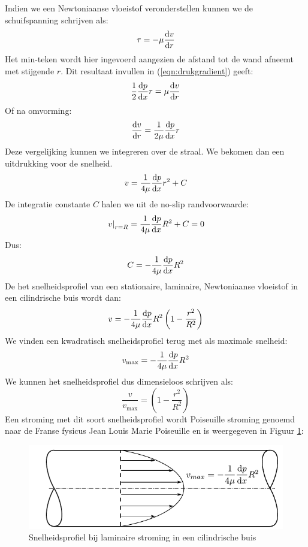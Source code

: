 Indien we een Newtoniaanse vloeistof veronderstellen kunnen we de schuifspanning schrijven als:
\begin{equation}
	\tau = -\mu \frac{\mathrm{d} v}{\mathrm{d} r}
\end{equation}
Het min-teken wordt hier ingevoerd aangezien de afstand tot de wand afneemt met stijgende $r$. Dit resultaat invullen in (\ref{eqn:drukgradient}) geeft:
\begin{equation}
	\frac{1}{2} \frac{\mathrm{d} p}{\mathrm{d} x} r = \mu \frac{\mathrm{d} v}{\mathrm{d} r}
\end{equation}
Of na omvorming:
\begin{equation}
	\frac{\mathrm{d} v}{\mathrm{d} r} = \frac{1}{2 \mu}\frac{\mathrm{d} p}{\mathrm{d} x} r
\end{equation}
Deze vergelijking kunnen we integreren over de straal. We bekomen dan een uitdrukking voor de snelheid.
\begin{equation}
	v = \frac{1}{4 \mu}\frac{\mathrm{d} p}{\mathrm{d} x} r^2 + C
\end{equation}
De integratie constante $C$ halen we uit de no-slip randvoorwaarde:
\begin{equation}
	\left.v\right|_{r=R} = \frac{1}{4 \mu}\frac{\mathrm{d} p}{\mathrm{d} x} R^2 + C  = 0
\end{equation}
Dus:
\begin{equation}
	C = - \frac{1}{4 \mu}\frac{\mathrm{d} p}{\mathrm{d} x} R^2
\end{equation}
De het snelheidsprofiel van een stationaire, laminaire, Newtoniaanse vloeistof in een cilindrische buis wordt dan:
\begin{equation}
	v = - \frac{1}{4 \mu}\frac{\mathrm{d} p}{\mathrm{d} x} R^2 \left(1- \frac{r^2}{R^2}\right)
\end{equation}
We vinden een kwadratisch snelheidsprofiel terug met als maximale snelheid:
\begin{equation}
	v_{\text{max}} = - \frac{1}{4 \mu}\frac{\mathrm{d} p}{\mathrm{d} x} R^2
\end{equation}
We kunnen het snelheidsprofiel dus dimensieloos schrijven als:
\begin{equation}
	\frac{v}{v_{\text{max}}} = \left(1- \frac{r^2}{R^2}\right)
\end{equation}
Een stroming met dit soort snelheidsprofiel wordt Poiseuille stroming genoemd naar de Franse fysicus Jean Louis Marie Poiseuille en is weergegeven in Figuur \ref{fig:laminair_snelheidsprofiel}:
\begin{figure}[htb]
	\centering
	\includegraphics{fig/inwendige_stroming/Laminair_snelheidsprofiel}
	\caption{Snelheidsprofiel bij laminaire stroming in een cilindrische buis}
	\label{fig:laminair_snelheidsprofiel}
\end{figure}

